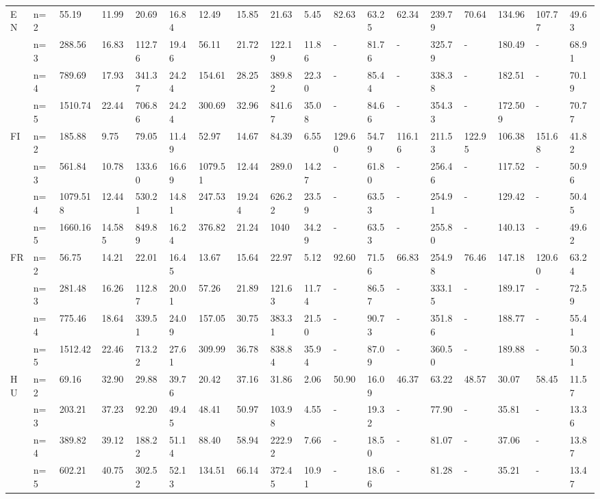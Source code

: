 \documentclass[11pt]{article}
\begin{document}
\begin{table*}
{\begin{tabular}{llllllll|ll|llllllll}
 \multirow{3}{*}{EN} 
 & n=2 &55.19&11.99&20.69 &16.84 & 12.49&15.85 & 21.63&5.45 &82.63&63.25&62.34&239.79&70.64&134.96&107.77&49.63\\
 & n=3 &288.56&16.83&112.76&19.46&56.11 &21.72 & 122.19&11.86 &-&81.76&-&325.79&-&180.49&-&68.91\\
 & n=4 &789.69&17.93 &341.37 & 24.24& 154.61& 28.25& 389.82&22.30 &-&85.44&-&338.38&-&182.51&-&70.19\\
 & n=5 &1510.74&22.44 &706.86 &24.24 &300.69 & 32.96& 841.67&35.08 &-&84.66&-&354.33&-&172.509&-&70.77\\\hline
 
 \multirow{3}{*}{FI}
 & n=2 &185.88&9.75 & 79.05& 11.49&52.97 &14.67 & 84.39&6.55 &129.60&54.79&116.16&211.53&122.95&106.38&151.68&41.82\\
 & n=3 &561.84&10.78 &133.60 &16.69 & 1079.51& 12.44& 289.0&14.27 &-&61.80&-&256.46&-&117.52&-&50.96\\
 & n=4 &1079.518&12.44&530.21&14.81 & 247.53& 19.244 & 626.22&23.59 &-&63.53&-&254.91&-&129.42&-&50.45\\
 & n=5 &1660.16&14.585 & 849.89& 16.24& 376.82& 21.24& 1040&34.29 &-&63.53&-&255.80&-&140.13&-&49.62\\\hline
 
 \multirow{3}{*}{FR}
 & n=2 &56.75&14.21 & 22.01&16.45 &13.67 &15.64 & 22.97&5.12 &92.60&71.56&66.83&254.98&76.46&147.18&120.60&63.24\\
 & n=3 &281.48& 16.26& 112.87& 20.01&57.26 &21.89 & 121.63&11.74 &-&86.57&-&333.15&-&189.17&-&72.59\\
 & n=4 &775.46&18.64 &339.51 &24.09 & 157.05& 30.75& 383.31&21.50 &-&90.73&-&351.86&-&188.77&-&55.41\\
 & n=5 &1512.42&22.46 & 713.22& 27.61 &309.99 & 36.78& 838.84&35.94 &-&87.09&-&360.50&-&189.88&-&50.31\\\hline
 
 \multirow{3}{*}{HU}
 & n=2 &69.16&32.90 &29.88 &39.76 & 20.42&37.16 & 31.86&2.06 &50.90&16.09&46.37&63.22&48.57&30.07&58.45&11.57\\
 & n=3 &203.21&37.23 & 92.20& 49.45&48.41 & 50.97& 103.98&4.55 &-&19.32&-&77.90&-&35.81&-&13.36\\
 & n=4 &389.82&39.12 &188.22 & 51.14 &88.40 &58.94 & 222.92&7.66 &-&18.50&-&81.07&-&37.06&-&13.87\\
 & n=5 &602.21&40.75 & 302.52&52.13 & 134.51& 66.14& 372.45&10.91 &-&18.66&-&81.28&-&35.21&-&13.47\\\hline
 

\end{tabular}}
\end{table*}
\end{document}
